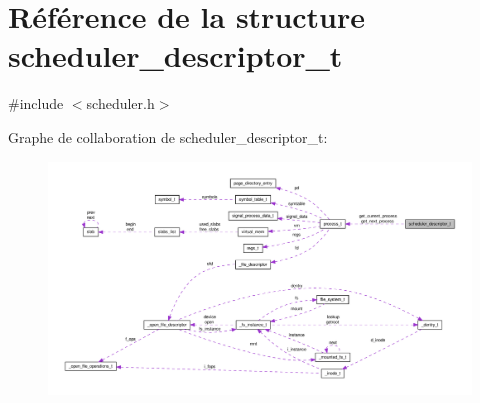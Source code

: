 \hypertarget{structscheduler__descriptor__t}{\section{\-Référence de la structure scheduler\-\_\-descriptor\-\_\-t}
\label{structscheduler__descriptor__t}
}


{\ttfamily \#include $<$scheduler.\-h$>$}



\-Graphe de collaboration de scheduler\-\_\-descriptor\-\_\-t\-:\nopagebreak
\begin{figure}[H]
\begin{center}
\leavevmode
\includegraphics[width=350pt]{structscheduler__descriptor__t__coll__graph}
\end{center}
\end{figure}
